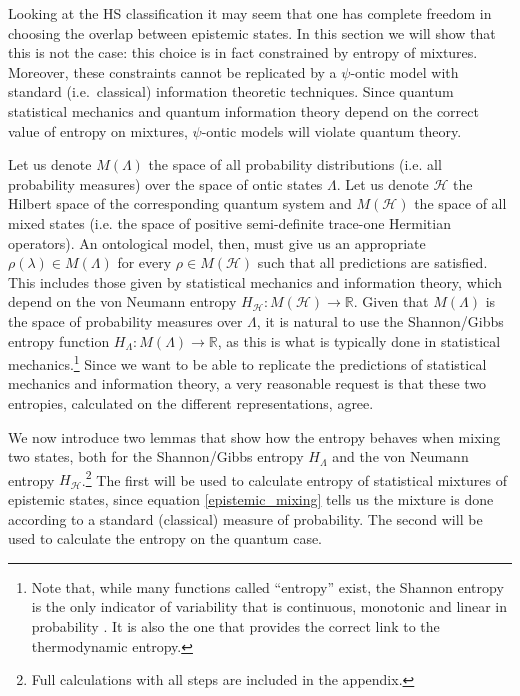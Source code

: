 \documentclass[10pt,twocolumn, nofootinbib]{revtex4-2}
\begin{document}
Looking at the HS classification it may seem that one has complete freedom in choosing the overlap between epistemic states. In this section we will show that this is not the case: this choice is in fact constrained by entropy of mixtures. Moreover, these constraints cannot be replicated by a $\psi$-ontic model with standard (i.e.\ classical) information theoretic techniques. Since quantum statistical mechanics and quantum information theory depend on the correct value of entropy on mixtures, $\psi$-ontic models will violate quantum theory.

Let us denote $M(\Lambda)$ the space of all probability distributions (i.e. all probability measures) over the space of ontic states $\Lambda$. Let us denote $\mathcal{H}$ the Hilbert space of the corresponding quantum system and $M(\mathcal{H})$ the space of all mixed states (i.e. the space of positive semi-definite trace-one Hermitian operators). An ontological model, then, must give us an appropriate $\rho(\lambda) \in M(\Lambda)$ for every $\rho \in M(\mathcal{H})$ such that all predictions are satisfied. This includes those given by statistical mechanics and information theory, which depend on the von Neumann entropy $H_\mathcal{H} : M(\mathcal{H}) \to \mathbb{R}$. Given that $M(\Lambda)$ is the space of probability measures over $\Lambda$, it is natural to use the Shannon/Gibbs entropy function $H_\Lambda : M(\Lambda) \to \mathbb{R}$, as this is what is typically done in statistical mechanics.\footnote{Note that, while many functions called ``entropy'' exist, the Shannon entropy is the only indicator of variability that is continuous, monotonic and linear in probability \cite{Carcassi:2021}. It is also the one that provides the correct link to the thermodynamic entropy.} Since we want to be able to replicate the predictions of statistical mechanics and information theory, a very reasonable request is that these two entropies, calculated on the different representations, agree.

We now introduce two lemmas that show how the entropy behaves when mixing two states, both for the Shannon/Gibbs entropy $H_\Lambda$ and the von Neumann entropy $H_\mathcal{H}$.\footnote{Full calculations with all steps are included in the appendix.} The first will be used to calculate entropy of statistical mixtures of epistemic states, since equation \ref{epistemic_mixing} tells us the mixture is done according to a standard (classical) measure of probability. The second will be used to calculate the entropy on the quantum case.
\end{document}
